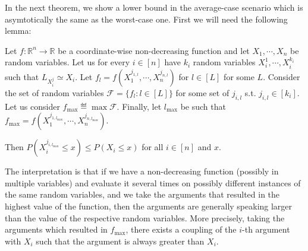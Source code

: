 In the next theorem, we show a lower bound in the average-case scenario which is asymtotically the same as the worst-case one. First we will need the following lemma:

\begin{lemma} \label{lem:probabilistic_bound}
Let $f: \mathbb{R}^n \rightarrow \mathbb{R}$ be a coordinate-wise non-decreasing function and let $X_1, \cdots, X_n$ be random variables. Let us for every $i \in [n]$ have $k_i$ random variables $X_i^1, \cdots, X_i^{k_i}$ such that $L_{X_i^j} \simeq X_i$. Let $f_l = f(X_1^{j_{1,l}}, \cdots, X_n^{j_{n,l}})$ for $l \in [L]$ for some $L$. Consider the set of random variables $\mathcal{F} = \{f_l: l \in [L]\}$ for some set of $j_{i,l}$ s.t. $j_{i,l} \in [k_i]$. Let us consider $f_\text{max} \eqdef \max \mathcal{F}$. Finally, let $l_\text{max}$ be such that $f_\text{max} = f(X_1^{j_{1,l_\text{max}}}, \cdots, X_n^{j_{n,l_\text{max}}})$.

Then $P(X_i^{j_{i,l_\text{max}}} \leq x) \leq P(X_i \leq x)$ for all $i \in [n]$ and $x$.
\end{lemma}
The interpretation is that if we have a non-decreasing function (possibly in multiple variables) and evaluate it several times on possibly different instances of the same random variables, and we take the arguments that resulted in the highest value of the function, then the arguments are generally speaking larger than the value of the respective random variables. More precisely, taking the arguments which resulted in $f_\text{max}$, there exists a coupling of the $i$-th argument with $X_i$ such that the argument is always greater than $X_i$.
